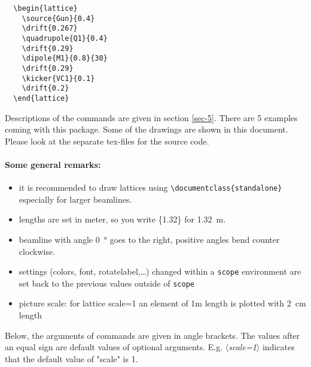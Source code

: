 \documentclass[a4paper]{scrartcl}
\newcommand{\optiondef}[2]{{\color{green!50!black}$\langle$\textit{#1=#2}$\rangle$}}
\begin{document}
\begin{minipage}[c]{0.5\textwidth}
\begin{lstlisting}
  \begin{lattice}
    \source{Gun}{0.4}
    \drift{0.267}
    \quadrupole{Q1}{0.4}
    \drift{0.29}
    \dipole{M1}{0.8}{30}
    \drift{0.29}
    \kicker{VC1}{0.1}
    \drift{0.2}   
  \end{lattice}
\end{lstlisting}
\end{minipage}
%
\begin{minipage}[c]{0.5\textwidth}
  \begin{center}
    \begin{lattice}
    \end{lattice}
  \end{center}
\end{minipage}


Descriptions of the commands are given in section \ref{sec-5}. There are 5 examples coming
with this package. Some of the drawings are shown in this document. Please look at the
separate tex-files for the source code.

\paragraph{Some general remarks:}
\begin{itemize}
\item it is recommended to draw lattices using \lstinline+\documentclass{standalone}+
  especially for larger beamlines.
\item lengths are set in meter, so you write \{1.32\} for \SI{1.32}{\m}.
\item beamline with angle \SI{0}{\degree} goes to the right, positive angles bend counter clockwise.
\item settings (colors, font, rotatelabel,\ldots{}) changed within a \verb+scope+ environment are set back to the previous values outside of \verb+scope+
\item picture scale: for lattice scale=1 an element of 1m length is plotted with \SI{2}{\cm} length
\end{itemize}

Below, the arguments of commands are given in angle brackets. The values after an equal
sign are default values of optional arguments. E.g. \optiondef{scale}{1} indicates that
the default value of "scale" is 1.
\end{document}
